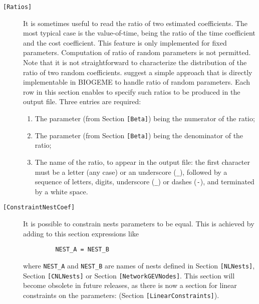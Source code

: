 \documentclass[12pt,a4paper]{article}
\newcommand{\specitem}[1]{\texttt{[#1]}}
\begin{document}
\begin{description}
   \item[\specitem{Ratios}] It is sometimes useful to read the ratio of two
      estimated coefficients. The most typical case is the value-of-time, being the
      ratio of the time coefficient and the cost coefficient. This feature is only implemented for fixed parameters. 
      Computation of ratio of random parameters is not permitted.  Note that it is not 
      straightforward to characterize the distribution of the ratio of two random coefficients.  
       suggest a simple approach that is directly implementable in BIOGEME
      to handle ratio of random parameters.
      Each row in this section enables to specify such ratios to be produced in the output
      file. Three entries are required:
      \begin{enumerate}
         \item The parameter (from Section \verb+[Beta]+) being the numerator of the ratio;
         \item The parameter (from Section \verb+[Beta]+) being the denominator of the ratio;
         \item The name of the ratio, to appear in the output file:  the first character must be a letter (any case) or an underscore
            (\verb+_+), followed by a sequence of letters, digits, underscore (\verb+_+)
            or dashes (\verb+-+), and terminated by a white space. 
      \end{enumerate}

   \item[\specitem{ConstraintNestCoef}] It is possible to
      constrain nests parameters to be equal. This is achieved by adding to this section expressions like
      \begin{verbatim}
         NEST_A = NEST_B
      \end{verbatim} 
      where \verb+NEST_A+ and \verb+NEST_B+ are names of nests defined in Section \verb+[NLNests]+, Section \verb+[CNLNests]+ or  Section \verb+[NetworkGEVNodes]+. This section will become obsolete in future releases, as there is now a section for linear constraints on the parameters: (Section \verb+[LinearConstraints]+).


\end{description}
\end{document}
